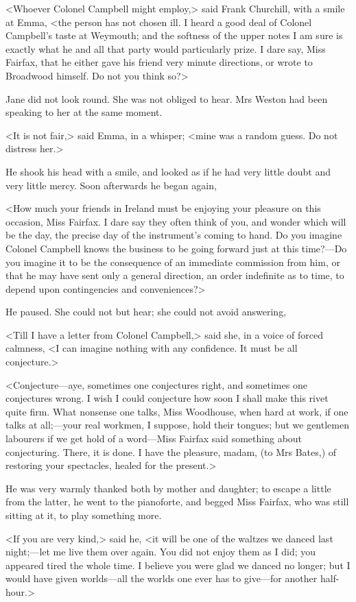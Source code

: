 <Whoever Colonel Campbell might employ,> said Frank Churchill, with a smile at Emma, <the person has not chosen ill. I heard a good deal of Colonel Campbell's taste at Weymouth; and the softness of the upper notes I am sure is exactly what he and all that party would particularly prize. I dare say, Miss Fairfax, that he either gave his friend very minute directions, or wrote to Broadwood himself. Do not you think so?>

Jane did not look round. She was not obliged to hear. Mrs Weston had been speaking to her at the same moment.

<It is not fair,> said Emma, in a whisper; <mine was a random guess. Do not distress her.>

He shook his head with a smile, and looked as if he had very little doubt and very little mercy. Soon afterwards he began again,

<How much your friends in Ireland must be enjoying your pleasure on this occasion, Miss Fairfax. I dare say they often think of you, and wonder which will be the day, the precise day of the instrument's coming to hand. Do you imagine Colonel Campbell knows the business to be going forward just at this time?—Do you imagine it to be the consequence of an immediate commission from him, or that he may have sent only a general direction, an order indefinite as to time, to depend upon contingencies and conveniences?>

He paused. She could not but hear; she could not avoid answering,

<Till I have a letter from Colonel Campbell,> said she, in a voice of forced calmness, <I can imagine nothing with any confidence. It must be all conjecture.>

<Conjecture—aye, sometimes one conjectures right, and sometimes one conjectures wrong. I wish I could conjecture how soon I shall make this rivet quite firm. What nonsense one talks, Miss Woodhouse, when hard at work, if one talks at all;—your real workmen, I suppose, hold their tongues; but we gentlemen labourers if we get hold of a word—Miss Fairfax said something about conjecturing. There, it is done. I have the pleasure, madam, (to Mrs Bates,) of restoring your spectacles, healed for the present.>

He was very warmly thanked both by mother and daughter; to escape a little from the latter, he went to the pianoforte, and begged Miss Fairfax, who was still sitting at it, to play something more.

<If you are very kind,> said he, <it will be one of the waltzes we danced last night;—let me live them over again. You did not enjoy them as I did; you appeared tired the whole time. I believe you were glad we danced no longer; but I would have given worlds—all the worlds one ever has to give—for another half-hour.>

